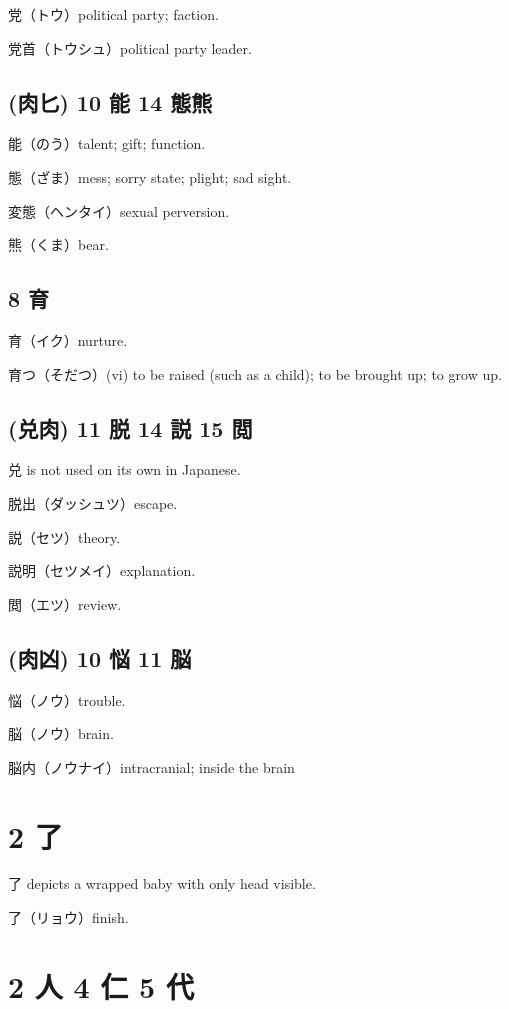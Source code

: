 党（トウ）political party; faction.

党首（トウシュ）political party leader.

\subsection{(肉匕) 10 能 14 態熊}

能（のう）talent; gift; function.

態（ざま）mess; sorry state; plight; sad sight.

変態（ヘンタイ）sexual perversion.

熊（くま）bear.

\subsection{8 育}

育（イク）nurture.

育つ（そだつ）(vi) to be raised (such as a child); to be brought up; to grow up.

\subsection{(兑肉) 11 脱 14 説 15 閲}

兑 is not used on its own in Japanese.

脱出（ダッシュツ）escape.

説（セツ）theory.

説明（セツメイ）explanation.

閲（エツ）review.

\subsection{(肉凶) 10 悩 11 脳}

悩（ノウ）trouble.

脳（ノウ）brain.

脳内（ノウナイ）intracranial; inside the brain

\section{2 了}

了 depicts a wrapped baby with only head visible.

了（リョウ）finish.

\section{2 人 4 仁 5 代}


